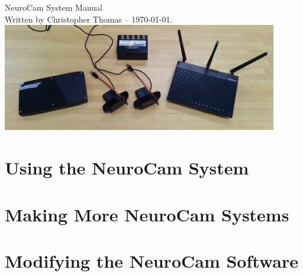 \documentclass[letterpaper,11pt]{report}
\begin{document}

\pagestyle{empty}

\begin{center}
%
\vspace*{1.5in}
{\Huge NeuroCam System Manual} \\
{\footnotesize Written by Christopher Thomas -- \today.} \\
%
\vspace*{1in}
\includegraphics[width=0.9\textwidth]{pics-system/sys-all-d.jpg}
%
\vfill
{\footnotesize }
%
\end{center}
%
\clearpage
%
\pagestyle{plain}
\setcounter{page}{1}
%
\tableofcontents
%
\clearpage
\pagestyle{plain}
\setcounter{page}{1}
\renewcommand{\thispagestyle}[1]{}


\clearpage
\pagestyle{empty}
\part{Using the NeuroCam System}
\pagestyle{plain}








\clearpage
\pagestyle{empty}
\part{Making More NeuroCam Systems}
\pagestyle{plain}







\clearpage
\pagestyle{empty}
\part{Modifying the NeuroCam Software}
\pagestyle{plain}






\end{document}
